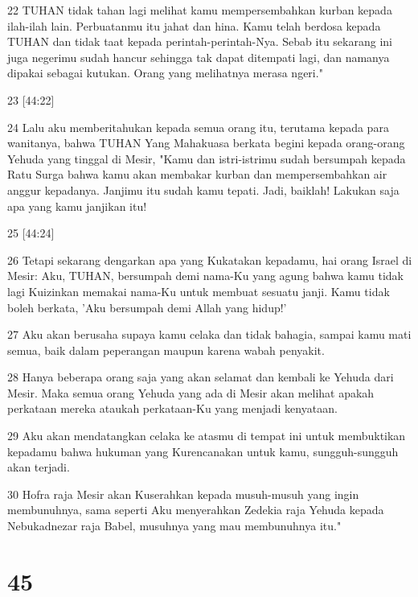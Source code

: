 \par 22 TUHAN tidak tahan lagi melihat kamu mempersembahkan kurban kepada ilah-ilah lain. Perbuatanmu itu jahat dan hina. Kamu telah berdosa kepada TUHAN dan tidak taat kepada perintah-perintah-Nya. Sebab itu sekarang ini juga negerimu sudah hancur sehingga tak dapat ditempati lagi, dan namanya dipakai sebagai kutukan. Orang yang melihatnya merasa ngeri."
\par 23 [44:22]
\par 24 Lalu aku memberitahukan kepada semua orang itu, terutama kepada para wanitanya, bahwa TUHAN Yang Mahakuasa berkata begini kepada orang-orang Yehuda yang tinggal di Mesir, "Kamu dan istri-istrimu sudah bersumpah kepada Ratu Surga bahwa kamu akan membakar kurban dan mempersembahkan air anggur kepadanya. Janjimu itu sudah kamu tepati. Jadi, baiklah! Lakukan saja apa yang kamu janjikan itu!
\par 25 [44:24]
\par 26 Tetapi sekarang dengarkan apa yang Kukatakan kepadamu, hai orang Israel di Mesir: Aku, TUHAN, bersumpah demi nama-Ku yang agung bahwa kamu tidak lagi Kuizinkan memakai nama-Ku untuk membuat sesuatu janji. Kamu tidak boleh berkata, 'Aku bersumpah demi Allah yang hidup!'
\par 27 Aku akan berusaha supaya kamu celaka dan tidak bahagia, sampai kamu mati semua, baik dalam peperangan maupun karena wabah penyakit.
\par 28 Hanya beberapa orang saja yang akan selamat dan kembali ke Yehuda dari Mesir. Maka semua orang Yehuda yang ada di Mesir akan melihat apakah perkataan mereka ataukah perkataan-Ku yang menjadi kenyataan.
\par 29 Aku akan mendatangkan celaka ke atasmu di tempat ini untuk membuktikan kepadamu bahwa hukuman yang Kurencanakan untuk kamu, sungguh-sungguh akan terjadi.
\par 30 Hofra raja Mesir akan Kuserahkan kepada musuh-musuh yang ingin membunuhnya, sama seperti Aku menyerahkan Zedekia raja Yehuda kepada Nebukadnezar raja Babel, musuhnya yang mau membunuhnya itu."

\chapter{45}

